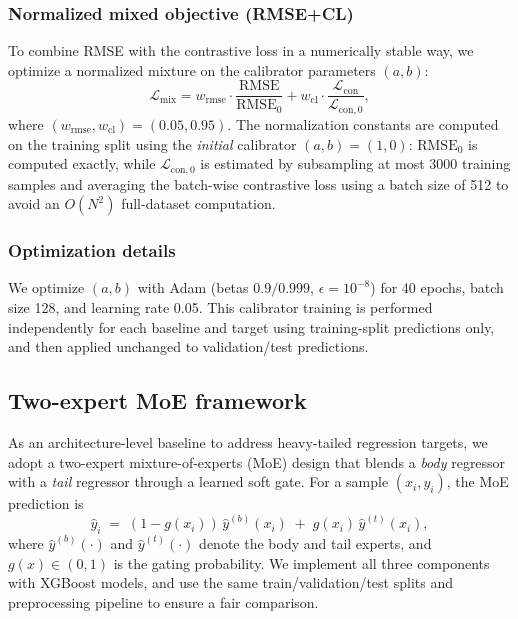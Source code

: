\documentclass[preprint,12pt]{elsarticle}
\begin{document}
\subsubsection{Normalized mixed objective (RMSE+CL)}
To combine RMSE with the contrastive loss in a numerically stable way, we optimize a normalized mixture on the calibrator parameters $(a,b)$:
\begin{equation}
\mathcal{L}_{\mathrm{mix}}
= w_{\mathrm{rmse}} \cdot \frac{\mathrm{RMSE}}{\mathrm{RMSE}_0}
+ w_{\mathrm{cl}}\cdot \frac{\mathcal{L}_{\mathrm{con}}}{\mathcal{L}_{\mathrm{con},0}},
\end{equation}
where $(w_{\mathrm{rmse}},w_{\mathrm{cl}})=(0.05,0.95)$. The normalization constants are computed on the training split using the \emph{initial} calibrator $(a,b)=(1,0)$: $\mathrm{RMSE}_0$ is computed exactly, while $\mathcal{L}_{\mathrm{con},0}$ is estimated by subsampling at most 3000 training samples and averaging the batch-wise contrastive loss using a batch size of 512 to avoid an $O(N^2)$ full-dataset computation.

\subsubsection{Optimization details}
We optimize $(a,b)$ with Adam (betas $0.9/0.999$, $\epsilon=10^{-8}$) for 40 epochs, batch size 128, and learning rate 0.05. This calibrator training is performed independently for each baseline and target using training-split predictions only, and then applied unchanged to validation/test predictions.

\subsection{Two-expert MoE framework}
As an architecture-level baseline to address heavy-tailed regression targets, we adopt a two-expert mixture-of-experts (MoE) design that blends a \emph{body} regressor with a \emph{tail} regressor through a learned soft gate. For a sample $(x_i,y_i)$, the MoE prediction is
\begin{equation}
    \hat{y}_i \;=\; (1-g(x_i))\,\hat{y}^{(b)}(x_i) \;+\; g(x_i)\,\hat{y}^{(t)}(x_i),
\end{equation}
where $\hat{y}^{(b)}(\cdot)$ and $\hat{y}^{(t)}(\cdot)$ denote the body and tail experts, and $g(x)\in(0,1)$ is the gating probability. We implement all three components with XGBoost models, and use the same train/validation/test splits and preprocessing pipeline to ensure a fair comparison.
\end{document}

